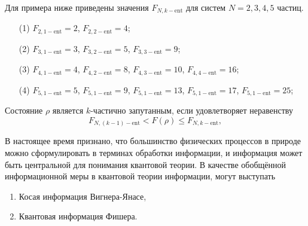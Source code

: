 Для примера ниже приведены значения $F_{N, k-\mathrm{ent}}$ 
для систем $N = 2, 3, 4, 5$ частиц.
\begin{itemize}
  \item[(1)] 
    $F_{2, 1-\mathrm{ent}}= 2$, 
    $F_{2, 2-\mathrm{ent}}= 4$;
  \item[(2)] 
    $F_{3, 1-\mathrm{ent}}= 3$, 
    $F_{3, 2-\mathrm{ent}}= 5$, 
    $F_{3, 3-\mathrm{ent}}= 9$;
  \item[(3)] 
    $F_{4, 1-\mathrm{ent}}= 4$, 
    $F_{4, 2-\mathrm{ent}}= 8$, 
    $F_{4, 3-\mathrm{ent}}= 10$,
    $F_{4, 4-\mathrm{ent}}= 16$; 
  \item[(4)] 
    $F_{5, 1-\mathrm{ent}}= 5$, 
    $F_{5, 1-\mathrm{ent}}= 9$, 
    $F_{5, 1-\mathrm{ent}}= 13$, 
    $F_{5, 1-\mathrm{ent}}= 17$, 
    $F_{5, 1-\mathrm{ent}}= 25$; 
\end{itemize}


\begin{definition}
  Состояние $\rho$ является $k$-частично запутанным,
  если удовлетворяет неравенству
  \begin{equation}
    F_{N, (k-1)-\mathrm{ent}} < F(\rho) \leq  F_{N, k-\mathrm{ent}},
  \end{equation}
\end{definition}

В настоящее время признано, 
что большинство физических процессов в природе можно сформулировать в терминах обработки информации, 
и информация может быть центральной для понимания квантовой теории\cite{Wheeler2004, Summhammer2004, Frieden2004}.
В качестве обобщённой информационной меры в квантовой теории информации, 
могут выступать
\begin{enumerate}
  \item Косая информация Вигнера-Янасе\cite{Zeqian2005},
  \item Квантовая информация Фишера\cite{Hyllus2012}.
\end{enumerate}

